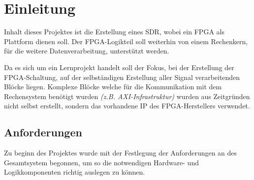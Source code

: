 \chapter{Einleitung}
Inhalt dieses Projektes ist die Erstellung eines \acs{SDR}, wobei ein \acs{FPGA} als Plattform dienen soll. 
Der \acs{FPGA}-Logikteil soll weiterhin von einem Rechenkern, für die weitere Datenverarbeitung, unterstützt werden.

Da es sich um ein Lernprojekt handelt soll der Fokus, bei der Erstellung der \acs{FPGA}-Schaltung, auf der selbständigen Erstellung aller Signal verarbeitenden Blöcke liegen.
Komplexe Blöcke welche für die Kommunikation mit dem Rechensystem benötigt wurden \textit{(z.B. AXI-Infrastruktur)} wurden aus Zeitgründen nicht selbst erstellt, sondern das vorhandene
IP des \acs{FPGA}-Herstellers verwendet.

\section{Anforderungen}
Zu beginn des Projektes wurde mit der Festlegung der Anforderungen an des Gesamtsystem begonnen, um so die notwendigen Hardware- und Logikkomponenten richtig auslegen zu können.

